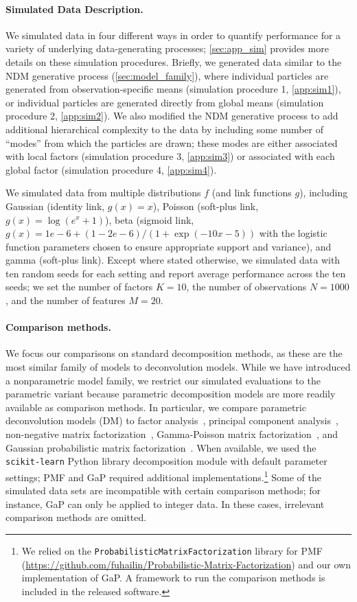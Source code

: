 \documentclass[twoside,11pt]{article}
\begin{document}
\paragraph{Simulated Data Description.}
We simulated data in four different ways in order to quantify performance for a variety of underlying data-generating processes; \cref{sec:app_sim} provides more details on these simulation procedures.  Briefly, we generated data similar to the NDM generative process (\cref{sec:model_family}), where individual particles are generated from observation-specific means (simulation procedure 1, \cref{app:sim1}), or individual particles are generated directly from global means (simulation procedure 2, \cref{app:sim2}).  We also modified the NDM generative process to add additional hierarchical complexity to the data by including some number of ``modes'' from which the particles are drawn; these modes are either associated with local factors (simulation procedure 3, \cref{app:sim3}) or associated with each global factor (simulation procedure 4, \cref{app:sim4}).

We simulated data from multiple distributions $f$ (and link functions $g$), including Gaussian (identity link, $g(x) = x$), Poisson (soft-plus link, $g(x) = \log(e^x + 1)$), beta (sigmoid link, $g(x) = 1e-6 + (1-2e-6) / (1 + \exp(-10x -5))$ with the logistic function parameters chosen to ensure appropriate support and variance), and gamma (soft-plus link).
Except where stated otherwise, we simulated data with ten random seeds for each setting and report average performance across the ten seeds; we set the number of factors $K=10$, the number of observations $N=1000$, and the number of features $M=20$.

\paragraph{Comparison methods.}  We focus our comparisons on standard decomposition methods, as these are the most similar family of models to deconvolution models.  While we have introduced a nonparametric model family, we restrict our simulated evaluations to the parametric variant because parametric decomposition models are more readily available as comparison methods. In particular, we compare parametric deconvolution models (DM) to 
factor analysis~\citep[FA;][]{harman1960modern},
principal component analysis~\citep[PCA;][]{hotelling1933analysis},
non-negative matrix factorization~\citep[NMF;][]{Lee01},
Gamma-Poisson matrix factorization~\citep[GaP;][]{CannyGaP}, and
Gaussian probabilistic matrix factorization~\citep[PMF;][]{PMF}.
When available, we used the \texttt{scikit-learn} Python library decomposition module \cite{scikit-learn} with default parameter settings; PMF and GaP required additional implementations.\footnote{We relied on the \texttt{ProbabilisticMatrixFactorization} library for PMF (\url{https://github.com/fuhailin/Probabilistic-Matrix-Factorization}) and our own implementation of GaP.  A framework to run the comparison methods is included in the released software.}
Some of the simulated data sets are incompatible with certain comparison methods; for instance, GaP can only be applied to integer data.  In these cases, irrelevant comparison methods are omitted.
\end{document}
